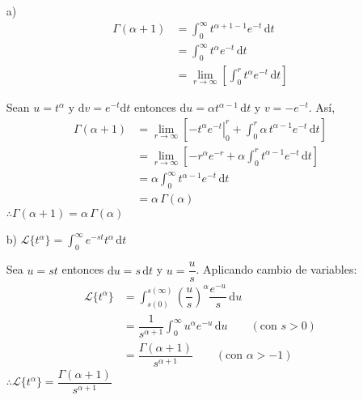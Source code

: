 \documentclass[fleqn]{article}
\begin{document}
    \begin{enumerate}
        \item[a)] 
        \begin{align*}
            \Gamma (\alpha + 1) &= \displaystyle \int_0^\infty t^{\alpha + 1 - 1} e^{-t} \, \mathrm{d}t \\
            &= \int_0^\infty t^{\alpha} e^{-t} \, \mathrm{d}t \\
            &= \lim_{r \to \infty} \left[ \int_0^r t^{\alpha} e^{-t} \, \mathrm{d}t \right]
        \end{align*}
        
        Sean $ u = t^\alpha $ y $ \mathrm{d}v = e^{-t} \mathrm{d}t $ entonces $ \mathrm{d}u = \alpha t^{\alpha - 1} \, \mathrm{d}t $ y $ v = -e^{-t} $. Así,
        \begin{align*}
            \Gamma (\alpha + 1) &= \lim_{r \to \infty} \left[ \left. -t^\alpha e^{-t} \right|_0^r + \int_0^r \alpha \, t^{\alpha - 1} e^{-t} \, \mathrm{d}t \right]  \\
            &= \lim_{r \to \infty} \left[ -r^\alpha e^{-r} + \alpha \int_0^r t^{\alpha - 1} e^{-t} \, \mathrm{d}t \right] \\
            &= \alpha \int_0^\infty t^{\alpha - 1} e^{-t} \, \mathrm{d}t \\
            &= \alpha \, \Gamma (\alpha)
        \end{align*}
        $ \therefore \Gamma (\alpha + 1) = \alpha \, \Gamma (\alpha) $

        \item[b)] $ \mathscr{L} \lbrace t^\alpha \rbrace = \displaystyle \int_0^\infty e^{-st} t^\alpha \, \mathrm{d}t $
        
        Sea $ u = st $ entonces $ \mathrm{d}u = s \, \mathrm{d}t $ y $ u = \dfrac{u}{s} $. Aplicando cambio de variables:
        \begin{align*}
            \mathscr{L} \lbrace t^\alpha \rbrace &= \int_{s(0)}^{s(\infty)} \left( \dfrac{u}{s} \right)^\alpha \dfrac{e^{-u}}{s} \, \mathrm{d}u \\
            &= \dfrac{1}{s^{\alpha + 1}} \int_0^\infty u^\alpha e^{-u} \, \mathrm{d}u \qquad (\text{con } s > 0) \\
            &= \dfrac{\Gamma (\alpha + 1)}{s^{\alpha + 1}} \qquad (\text{con } \alpha > -1)
        \end{align*}
        $ \therefore \mathscr{L} \lbrace t^\alpha \rbrace = \dfrac{\Gamma (\alpha + 1)}{s^{\alpha + 1}} $
    \end{enumerate}
\end{document}
